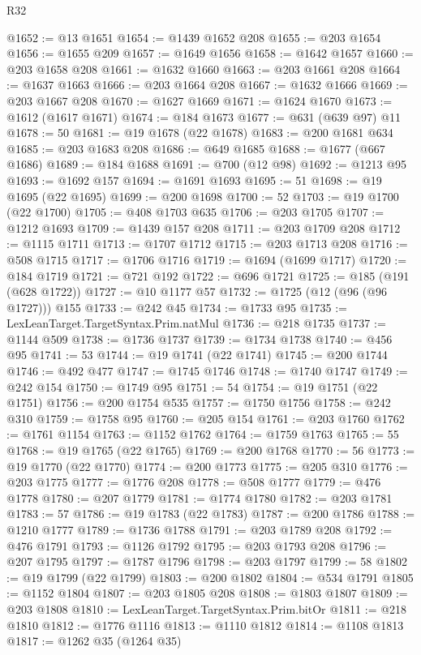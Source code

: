 \begin{lexlean}{R32}
\begin{coremodule}
@1652 := @13 @1651
@1654 := @1439 @1652 @208
@1655 := @203 @1654
@1656 := @1655 @209
@1657 := @1649 @1656
@1658 := @1642 @1657
@1660 := @203 @1658 @208
@1661 := @1632 @1660
@1663 := @203 @1661 @208
@1664 := @1637 @1663
@1666 := @203 @1664 @208
@1667 := @1632 @1666
@1669 := @203 @1667 @208
@1670 := @1627 @1669
@1671 := @1624 @1670
@1673 := @1612 (@1617 @1671)
@1674 := @184 @1673
@1677 := @631 (@639 @97) @11
@1678 := 50
@1681 := @19 @1678 (@22 @1678)
@1683 := @200 @1681 @634
@1685 := @203 @1683 @208
@1686 := @649 @1685
@1688 := @1677 (@667 @1686)
@1689 := @184 @1688
@1691 := @700 (@12 @98)
@1692 := @1213 @95
@1693 := @1692 @157
@1694 := @1691 @1693
@1695 := 51
@1698 := @19 @1695 (@22 @1695)
@1699 := @200 @1698
@1700 := 52
@1703 := @19 @1700 (@22 @1700)
@1705 := @408 @1703 @635
@1706 := @203 @1705
@1707 := @1212 @1693
@1709 := @1439 @157 @208
@1711 := @203 @1709 @208
@1712 := @1115 @1711
@1713 := @1707 @1712
@1715 := @203 @1713 @208
@1716 := @508 @1715
@1717 := @1706 @1716
@1719 := @1694 (@1699 @1717)
@1720 := @184 @1719
@1721 := @721 @192
@1722 := @696 @1721
@1725 := @185 (@191 (@628 @1722))
@1727 := @10 @1177 @57
@1732 := @1725 (@12 (@96 (@96 @1727))) @155
@1733 := @242 @45
@1734 := @1733 @95
@1735 := LexLeanTarget.TargetSyntax.Prim.natMul
@1736 := @218 @1735
@1737 := @1144 @509
@1738 := @1736 @1737
@1739 := @1734 @1738
@1740 := @456 @95
@1741 := 53
@1744 := @19 @1741 (@22 @1741)
@1745 := @200 @1744
@1746 := @492 @477
@1747 := @1745 @1746
@1748 := @1740 @1747
@1749 := @242 @154
@1750 := @1749 @95
@1751 := 54
@1754 := @19 @1751 (@22 @1751)
@1756 := @200 @1754 @535
@1757 := @1750 @1756
@1758 := @242 @310
@1759 := @1758 @95
@1760 := @205 @154
@1761 := @203 @1760
@1762 := @1761 @1154
@1763 := @1152 @1762
@1764 := @1759 @1763
@1765 := 55
@1768 := @19 @1765 (@22 @1765)
@1769 := @200 @1768
@1770 := 56
@1773 := @19 @1770 (@22 @1770)
@1774 := @200 @1773
@1775 := @205 @310
@1776 := @203 @1775
@1777 := @1776 @208
@1778 := @508 @1777
@1779 := @476 @1778
@1780 := @207 @1779
@1781 := @1774 @1780
@1782 := @203 @1781
@1783 := 57
@1786 := @19 @1783 (@22 @1783)
@1787 := @200 @1786
@1788 := @1210 @1777
@1789 := @1736 @1788
@1791 := @203 @1789 @208
@1792 := @476 @1791
@1793 := @1126 @1792
@1795 := @203 @1793 @208
@1796 := @207 @1795
@1797 := @1787 @1796
@1798 := @203 @1797
@1799 := 58
@1802 := @19 @1799 (@22 @1799)
@1803 := @200 @1802
@1804 := @534 @1791
@1805 := @1152 @1804
@1807 := @203 @1805 @208
@1808 := @1803 @1807
@1809 := @203 @1808
@1810 := LexLeanTarget.TargetSyntax.Prim.bitOr
@1811 := @218 @1810
@1812 := @1776 @1116
@1813 := @1110 @1812
@1814 := @1108 @1813
@1817 := @1262 @35 (@1264 @35)

\end{coremodule}
\end{lexlean}
